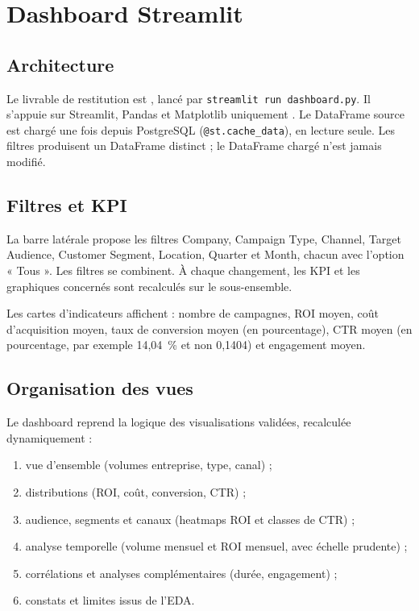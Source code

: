 \chapter{Dashboard Streamlit}
\label{chap:dashboard}

\section{Architecture}

Le livrable de restitution est , lancé par \texttt{streamlit run dashboard.py}. Il s'appuie sur Streamlit, Pandas et Matplotlib uniquement \cite{streamlitdocs}. Le DataFrame source est chargé une fois depuis PostgreSQL (\texttt{@st.cache\_data}), en lecture seule. Les filtres produisent un DataFrame distinct ; le DataFrame chargé n'est jamais modifié.

\section{Filtres et KPI}

La barre latérale propose les filtres Company, Campaign Type, Channel, Target Audience, Customer Segment, Location, Quarter et Month, chacun avec l'option « Tous ». Les filtres se combinent. À chaque changement, les KPI et les graphiques concernés sont recalculés sur le sous-ensemble.

Les cartes d'indicateurs affichent : nombre de campagnes, ROI moyen, coût d'acquisition moyen, taux de conversion moyen (en pourcentage), CTR moyen (en pourcentage, par exemple 14,04~\% et non 0,1404) et engagement moyen.

\section{Organisation des vues}

Le dashboard reprend la logique des visualisations validées, recalculée dynamiquement :

\begin{enumerate}
\item vue d'ensemble (volumes entreprise, type, canal) ;
\item distributions (ROI, coût, conversion, CTR) ;
\item audience, segments et canaux (heatmaps ROI et classes de CTR) ;
\item analyse temporelle (volume mensuel et ROI mensuel, avec échelle prudente) ;
\item corrélations et analyses complémentaires (durée, engagement) ;
\item constats et limites issus de l'EDA.
\end{enumerate}

